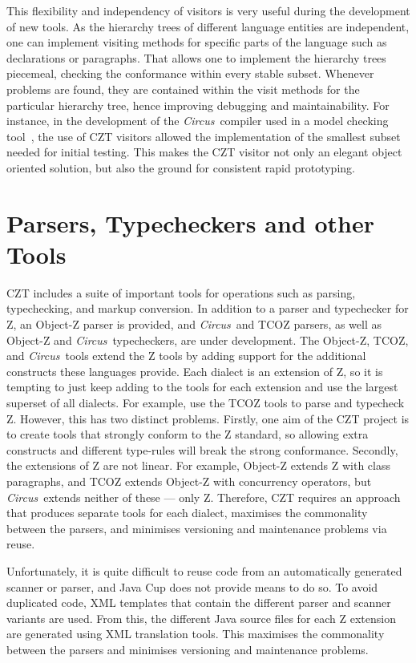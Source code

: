 \documentclass{llncs}
\newcommand{\Circus}{{\sf\slshape Circus}}
\begin{document}
  This flexibility and independency of visitors is very useful during
  the development of new tools.  As the hierarchy trees of different
  language entities are independent, one can implement visiting
  methods for specific parts of the language such as declarations or
  paragraphs.  That allows one to implement the hierarchy trees
  piecemeal, checking the conformance within every stable subset.
  Whenever problems are found, they are contained within the visit
  methods for the particular hierarchy tree, hence improving debugging
  and maintainability.  For instance, in the development of the
  \Circus\ compiler used in a model checking
  tool~\cite{circus.mc:leo}, the use of CZT visitors allowed the
  implementation of the smallest subset needed for initial testing.
  This makes the CZT visitor not only an elegant object oriented
  solution, but also the ground for consistent rapid prototyping.

\section{Parsers, Typecheckers and other Tools}

  CZT includes a suite of important tools for operations such as parsing,
  typechecking, and markup conversion. In addition to a parser and
  typechecker for Z, an Object-Z parser is provided, and \Circus\ and TCOZ
  parsers, as well as Object-Z and \Circus\ typecheckers, are under development.
  The Object-Z, TCOZ, and \Circus\ tools extend the Z tools by adding
  support for the additional constructs these languages provide.  Each
  dialect is an extension of Z, so it is tempting to just keep adding
  to the tools for each extension and use the largest superset of all
  dialects. For example, use the TCOZ tools to parse and typecheck
  Z. However, this has two distinct problems. Firstly, one aim of the
  CZT project is to create tools that strongly conform to the Z
  standard, so allowing extra constructs and different type-rules will
  break the strong conformance. Secondly, the extensions of Z are not
  linear. For example, Object-Z extends Z with class paragraphs, and
  TCOZ extends Object-Z with concurrency operators, but \Circus\ extends
  neither of these --- only Z. Therefore, CZT requires an approach that
  produces separate tools for each dialect, maximises the commonality
  between the parsers, and minimises versioning and maintenance
  problems via reuse.

  Unfortunately, it is quite difficult to reuse code from an
  automatically generated scanner or parser, and Java Cup does not
  provide means to do so.  To avoid duplicated code, XML templates that
  contain the different parser and scanner variants are used. From
  this, the different Java source files for each Z extension are generated
  using XML translation tools. This maximises the commonality between the
  parsers and minimises versioning and maintenance problems.
\end{document}
